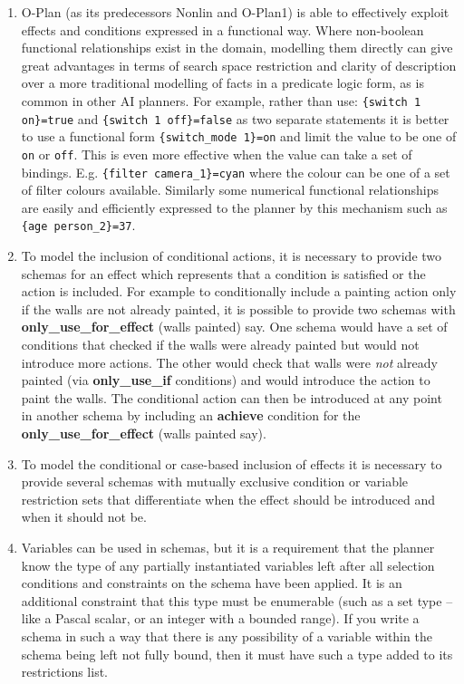 \begin{enumerate}

\item O-Plan (as its predecessors Nonlin and O-Plan1) is able to
effectively exploit effects and conditions expressed in a functional way.
Where non-boolean functional relationships exist in the domain, modelling them
directly can give great advantages in terms of search space restriction and
clarity of description over a more traditional modelling of facts in a
predicate logic form, as is common in other AI planners.  For example, rather
than use: {\tt \{switch 1 on\}=true} and {\tt \{switch 1 off\}=false} as two
separate statements it is better to use a functional form {\tt \{switch\_mode
1\}=on} and limit the value to be one of {\tt on} or {\tt off}.  This is even
more effective when the value can take a set of
bindings.  E.g. {\tt \{filter camera\_1\}=cyan} where the colour can be one
of a set of filter colours available.  Similarly some numerical functional
relationships are easily and efficiently expressed to the planner by this
mechanism such as {\tt \{age person\_2\}=37}.

\item To model the inclusion of conditional actions, it is necessary to
provide two schemas for an effect which represents that a condition is
satisfied or the action is included.  For example to conditionally include a
painting action only if the walls are not already painted, it is possible to
provide two schemas with {\bf only\_use\_for\_effect} (walls painted) say.  One
schema would have a set of conditions that checked if the walls were already
painted but would not introduce more actions.  The other would check that
walls were {\em not} already painted (via {\bf only\_use\_if} conditions) and
would introduce the action to paint the walls.  The conditional action can
then be introduced at any point in another schema by including an {\bf
achieve} condition for the {\bf only\_use\_for\_effect} ({walls painted} say).

\item To model the conditional or case-based inclusion of effects it is
necessary to provide several schemas with mutually exclusive condition or
variable restriction sets that differentiate when the effect should be
introduced and when it should not be.

\item Variables can be used in schemas, but it is a requirement that
the planner know the type of any partially instantiated variables left after
all selection conditions and constraints on the schema have been applied.
It is an additional constraint that this type must be enumerable (such as
a set type -- like a Pascal scalar, or an integer with a bounded range).
If you write a schema in such a way that there is any possibility of a
variable within the schema being left not fully bound, then it must have 
such a type added to its restrictions list.

\end{enumerate}

